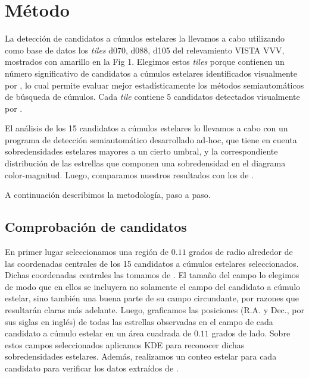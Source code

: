 \documentclass[baaa]{baaa}
\begin{document}
\section{Método}
La detección de candidatos a cúmulos estelares la llevamos a cabo utilizando como base de datos los \textit{tiles} d070, d088, d105 del relevamiento VISTA VVV, mostrados con amarillo en la Fig 1. Elegimos estos \textit{tiles} porque contienen un número significativo de candidatos a cúmulos estelares identificados visualmente por \cite{borissova2011new}, lo cual permite evaluar mejor estadísticamente los métodos semiautomáticos de búsqueda de cúmulos. Cada \textit{tile} contiene 5 candidatos detectados visualmente por \cite{borissova2011new}. \par
El análisis de los 15 candidatos a cúmulos estelares lo llevamos a cabo con un programa de detección semiautomático desarrollado ad-hoc, que tiene en cuenta sobredensidades estelares mayores a un cierto umbral, y la correspondiente distribución de las estrellas que componen una sobredensidad en el diagrama color-magnitud. Luego, comparamos nuestros resultados con los de \cite{borissova2011new}. \par
A continuación describimos la metodología, paso a paso.

\subsection{Comprobación de candidatos} 
\par
En primer lugar seleccionamos una región de  $0.11$ grados de radio alrededor de las coordenadas centrales de los 15 candidatos a cúmulos estelares seleccionados. Dichas coordenadas centrales las tomamos de \cite{borissova2011new}. El tamaño del campo lo elegimos de modo que en ellos se incluyera no solamente el campo del candidato a cúmulo estelar, sino también una buena parte de su campo circundante, por razones que resultarán claras más adelante. 
Luego, graficamos las posiciones (R.A. y Dec., por sus siglas en inglés) de todas las estrellas observadas en el campo de cada candidato a cúmulo estelar en un área cuadrada de $0.11$ grados de lado. Sobre estos campos seleccionados aplicamos {\sc KDE} para reconocer dichas sobredensidades estelares. Además, realizamos un conteo estelar para cada candidato para verificar los datos extraídos de \cite{borissova2011new}. \par
\end{document}
